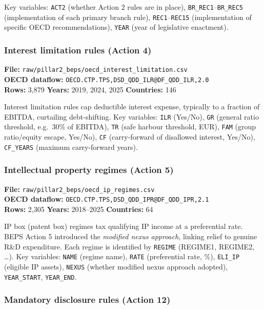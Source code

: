 \documentclass[11pt,a4paper]{article}
\newcommand{\code}[1]{\texttt{#1}}
\begin{document}
Key variables: \code{ACT2} (whether Action 2 rules are in place), \code{BR\_REC1}--\code{BR\_REC5} (implementation of each primary branch rule), \code{REC1}--\code{REC15} (implementation of specific OECD recommendations), \code{YEAR} (year of legislative enactment).

\subsubsection{Interest limitation rules (Action 4)}

\textbf{File:} \texttt{raw/pillar2\_beps/oecd\_interest\_limitation.csv}\\
\textbf{OECD dataflow:} \texttt{OECD.CTP.TPS,DSD\_QDD\_ILR@DF\_QDD\_ILR,2.0}\\
\textbf{Rows:} 3{,}879 \quad \textbf{Years:} 2019, 2024, 2025 \quad \textbf{Countries:} 146

Interest limitation rules cap deductible interest expense, typically to a fraction of EBITDA, curtailing debt-shifting.  Key variables: \code{ILR} (Yes/No), \code{GR} (general ratio threshold, e.g.\ 30\% of EBITDA), \code{TR} (safe harbour threshold, EUR), \code{FAM} (group ratio/equity escape, Yes/No), \code{CF} (carry-forward of disallowed interest, Yes/No), \code{CF\_YEARS} (maximum carry-forward years).

\subsubsection{Intellectual property regimes (Action 5)}

\textbf{File:} \texttt{raw/pillar2\_beps/oecd\_ip\_regimes.csv}\\
\textbf{OECD dataflow:} \texttt{OECD.CTP.TPS,DSD\_QDD\_IPR@DF\_QDD\_IPR,2.1}\\
\textbf{Rows:} 2{,}305 \quad \textbf{Years:} 2018--2025 \quad \textbf{Countries:} 64

IP box (patent box) regimes tax qualifying IP income at a preferential rate.  BEPS Action 5 introduced the \emph{modified nexus approach}, linking relief to genuine R\&D expenditure.  Each regime is identified by \code{REGIME} (REGIME1, REGIME2, \ldots).  Key variables: \code{NAME} (regime name), \code{RATE} (preferential rate, \%), \code{ELI\_IP} (eligible IP assets), \code{NEXUS} (whether modified nexus approach adopted), \code{YEAR\_START}, \code{YEAR\_END}.

\subsubsection{Mandatory disclosure rules (Action 12)}
\end{document}
